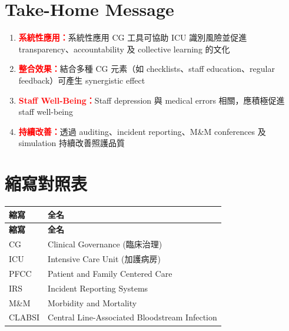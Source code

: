 \documentclass[12pt,a4paper]{article}
\begin{document}

\section{Take-Home Message}

\begin{enumerate}
    \item \textcolor{red}{\textbf{系統性應用：}}系統性應用 CG 工具可協助 ICU 識別風險並促進 transparency、accountability 及 collective learning 的文化
    \item \textcolor{red}{\textbf{整合效果：}}結合多種 CG 元素（如 checklists、staff education、regular feedback）可產生 synergistic effect
    \item \textcolor{red}{\textbf{Staff Well-Being：}}Staff depression 與 medical errors 相關，應積極促進 staff well-being
    \item \textcolor{red}{\textbf{持續改善：}}透過 auditing、incident reporting、M\&M conferences 及 simulation 持續改善照護品質
\end{enumerate}

\section{縮寫對照表}

\begin{longtable}{p{3cm}p{11cm}}
\toprule
\textbf{縮寫} & \textbf{全名} \\
\midrule
\endfirsthead

\toprule
\textbf{縮寫} & \textbf{全名} \\
\midrule
\endhead

\bottomrule
\endfoot

CG & Clinical Governance (臨床治理) \\
ICU & Intensive Care Unit (加護病房) \\
PFCC & Patient and Family Centered Care \\
IRS & Incident Reporting Systems \\
M\&M & Morbidity and Mortality \\
CLABSI & Central Line-Associated Bloodstream Infection \\
\bottomrule
\end{longtable}
\end{document}
